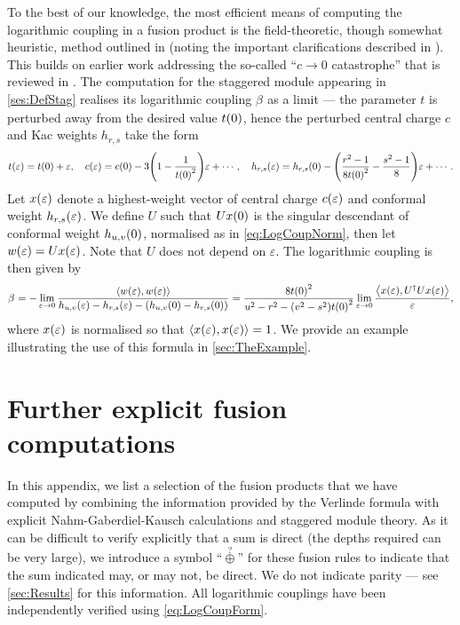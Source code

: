 \documentclass[a4paper,reqno,12pt]{report}
\theoremstyle{definition}
\numberwithin{equation}{section}
\let\originalleft\left     %
\let\originalright\right
\renewcommand{\left}{\mathopen{}\mathclose\bgroup\originalleft}
\renewcommand{\right}{\aftergroup\egroup\originalright}
\newcommand{\func}[2]{#1 \left( #2 \right)} %
\newcommand{\brac}[1]{\left( #1 \right)}
\newcommand{\inner}[2]{\left\langle #1 , #2 \right\rangle} %
\newcommand{\ra}{\rightarrow}
\newcommand{\logcoup}[2]{\beta_{#1}^{#2}}    %
\newcommand{\hw}{highest-weight}
\newcommand{\hws}{\hw{} vector}
\newcommand{\NGK}{Nahm-Gaberdiel-Kausch}
\newcommand{\eps}{\varepsilon}
\newcommand{\qplus}{\overset{\text{?}}{\oplus}}
\theoremstyle{plain}
\begin{document}
To the best of our knowledge, the most efficient means of computing the logarithmic coupling in a fusion product is the field-theoretic, though somewhat heuristic, method outlined in \cite{VasInd11} (noting the important clarifications described in \cite[App.~D]{GaiLat13}).  This builds on earlier work \cite{GurCon04} addressing the so-called ``$c \ra 0$ catastrophe'' that is reviewed in \cite{CarLog13,GurLog13}.  The computation for the staggered module appearing in \eqref{ses:DefStag} realises its logarithmic coupling $\logcoup{}{}$ as a limit --- the parameter $t$ is perturbed away from the desired value $\func{t}{0}$, hence the perturbed central charge $c$ and Kac weights $h_{r,s}$ take the form
\begin{equation} \label{eq:Perturb}
\func{t}{\eps} = \func{t}{0} + \eps, \quad 
\func{c}{\eps} = \func{c}{0} - 3 \brac{1 - \frac{1}{\func{t}{0}^2}} \eps + \cdots, \quad 
\func{h_{r,s}}{\eps} = \func{h_{r,s}}{0} - \brac{\frac{r^2-1}{8 \func{t}{0}^2} - \frac{s^2-1}{8}} \eps + \cdots.
\end{equation}
Let $\func{x}{\eps}$ denote a \hws{} of central charge $\func{c}{\eps}$ and conformal weight $\func{h_{r,s}}{\eps}$.  We define $U$ such that $U \func{x}{0}$ is the singular descendant of conformal weight $\func{h_{u,v}}{0}$, normalised as in \eqref{eq:LogCoupNorm}, then let $\func{w}{\eps} = U \func{x}{\eps}$.  Note that $U$ does not depend on $\eps$.  The logarithmic coupling is then given by \cite{VasInd11}
\begin{equation} \label{eq:LogCoupForm}
\logcoup{}{} = -\lim_{\eps \ra 0} \frac{\inner{\func{w}{\eps}}{\func{w}{\eps}}}{\func{h_{u,v}}{\eps} - \func{h_{r,s}}{\eps} - \brac{\func{h_{u,v}}{0} - \func{h_{r,s}}{0}}} = \frac{8 \func{t}{0}^2}{u^2-r^2 - \brac{v^2-s^2} \func{t}{0}^2} \lim_{\eps \ra 0} \frac{\inner{\func{x}{\eps}}{U^{\dag} U \func{x}{\eps}}}{\eps},
\end{equation}
where $\func{x}{\eps}$ is normalised so that $\inner{\func{x}{\eps}}{\func{x}{\eps}} = 1$.  We provide an example illustrating the use of this formula in \cref{sec:TheExample}.

\section{Further explicit fusion computations} \label{app:Results}

In this appendix, we list a selection of the fusion products that we have computed by combining the information provided by the Verlinde formula with explicit \NGK{} calculations and staggered module theory.  As it can be difficult to verify explicitly that a sum is direct (the depths required can be very large), we introduce a symbol ``$\qplus$'' for these fusion rules to indicate that the sum indicated may, or may not, be direct.  We do not indicate parity --- see \cref{sec:Results} for this information.  All logarithmic couplings have been independently verified using \eqref{eq:LogCoupForm}.
\end{document}
